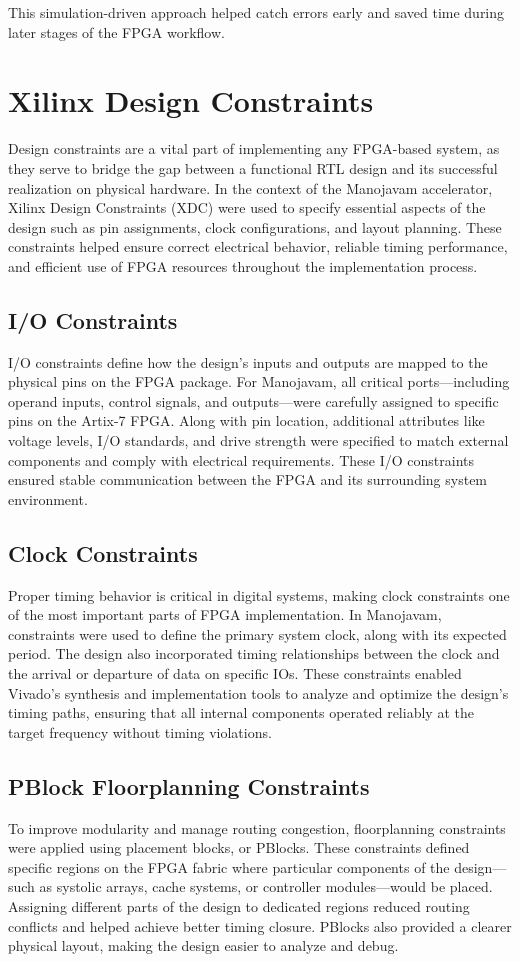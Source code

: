 This simulation-driven approach helped catch errors early and saved time during later stages of the FPGA workflow.

\section{Xilinx Design Constraints}
Design constraints are a vital part of implementing any FPGA-based system, as they serve to bridge the gap between a functional RTL design and its successful realization on physical hardware. In the context of the Manojavam accelerator, Xilinx Design Constraints (XDC) were used to specify essential aspects of the design such as pin assignments, clock configurations, and layout planning. These constraints helped ensure correct electrical behavior, reliable timing performance, and efficient use of FPGA resources throughout the implementation process.

\subsection{I/O Constraints}
I/O constraints define how the design’s inputs and outputs are mapped to the physical pins on the FPGA package. For Manojavam, all critical ports—including operand inputs, control signals, and outputs—were carefully assigned to specific pins on the Artix-7 FPGA. Along with pin location, additional attributes like voltage levels, I/O standards, and drive strength were specified to match external components and comply with electrical requirements. These I/O constraints ensured stable communication between the FPGA and its surrounding system environment.

\subsection{Clock Constraints}
Proper timing behavior is critical in digital systems, making clock constraints one of the most important parts of FPGA implementation. In Manojavam, constraints were used to define the primary system clock, along with its expected period. The design also incorporated timing relationships between the clock and the arrival or departure of data on specific IOs. These constraints enabled Vivado’s synthesis and implementation tools to analyze and optimize the design’s timing paths, ensuring that all internal components operated reliably at the target frequency without timing violations.

\subsection{PBlock Floorplanning Constraints}
To improve modularity and manage routing congestion, floorplanning constraints were applied using placement blocks, or PBlocks\cite{chap4-2}. These constraints defined specific regions on the FPGA fabric where particular components of the design—such as systolic arrays, cache systems, or controller modules—would be placed. Assigning different parts of the design to dedicated regions reduced routing conflicts and helped achieve better timing closure. PBlocks also provided a clearer physical layout, making the design easier to analyze and debug.

